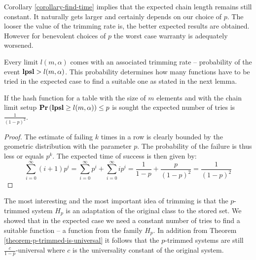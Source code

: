 Corollary \ref{corollary-find-time} implies that the expected chain length remains still constant. It naturally gets larger and certainly depends on our choice of $p$. The looser the value of the trimming rate is, the better expected results are obtained. However for benevolent choices of $p$ the worst case warranty is adequately worsened.

Every limit $l(m, \alpha)$ comes with an associated trimming rate -- probability of the event $\mathbf{lpsl} > l(m, \alpha)$. This probability determines how many functions have to be tried in the expected case to find a suitable one as stated in the next lemma.

\begin{lemma}
\label{lemma-linear-transformations-tries}
If the hash function for a table with the size of $m$ elements and with the chain limit setup $\mathbf{Pr}\left(\mathbf{lpsl} \geq l(m, \alpha)\right) \leq p$ is sought the expected number of tries is $\frac{1}{(1 - p)^2}$.
\end{lemma}
\begin{proof}
The estimate of failing $k$ times in a row is clearly bounded by the geometric distribution with  the parameter $p$. The probability of the failure is thus less or equals $p ^ k$. The expected time of success is then given by:
\[
\sum_{i = 0}^{\infty} (i + 1)p^i = \sum_{i = 0}^{\infty}p^i + \sum_{i = 0}^{\infty}ip^i = \frac{1}{1 - p} + \frac{p}{(1- p)^2} = \frac{1}{(1 - p)^2}
\]
\end{proof}

The most interesting and the most important idea of trimming is that the $p$-trimmed system $H_p$ is an adaptation of the original class to the stored set. We showed that in the expected case we need a constant number of tries to find a suitable function -- a function from the family $H_p$. In addition from Theorem \ref{theorem-p-trimmed-is-universal} it follows that the $p$-trimmed systems are still $\frac{c}{1 - p}$-universal where $c$ is the universality constant of the original system.

